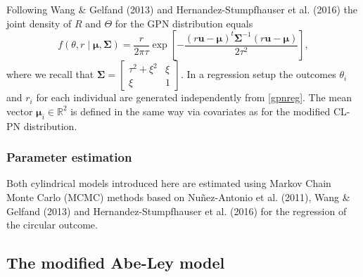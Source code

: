 \documentclass[12pt,]{article}
\begin{document}
Following Wang \& Gelfand (2013) and Hernandez-Stumpfhauser et al.
(2016) the joint density of \(R\) and \(\Theta\) for the GPN
distribution equals \begin{equation}\label{gpnreg}
f(\theta, r \mid \boldsymbol{\mu}, \boldsymbol{\Sigma}) = \frac{r}{2\pi\tau} \exp\left[ -\frac{(r\boldsymbol{u}-\boldsymbol{\mu})^{t}\boldsymbol{\Sigma}^{-1}(r\boldsymbol{u}-\boldsymbol{\mu})}{2\tau^2}\right],
\end{equation} \noindent where we recall that
\(\boldsymbol{\Sigma} = \begin{bmatrix} \tau^2 + \xi^2 & \xi\\ \xi & 1 \end{bmatrix}\).
In a regression setup the outcomes \(\theta_i\) and \(r_i\) for each
individual are generated independently from \eqref{gpnreg}. The mean
vector \(\boldsymbol{\mu}_i \in \mathbb{R}^2\) is defined in the same
way via covariates as for the modified CL-PN distribution.

\subsubsection{Parameter estimation}

Both cylindrical models introduced here are estimated using Markov Chain
Monte Carlo (MCMC) methods based on Nuñez-Antonio et al. (2011), Wang \&
Gelfand (2013) and Hernandez-Stumpfhauser et al. (2016) for the
regression of the circular outcome.

\subsection{The modified Abe-Ley model}\label{WeiSSVM}
\end{document}
